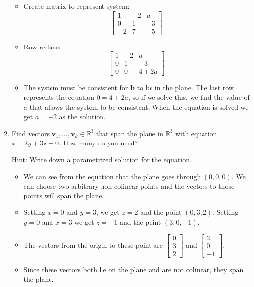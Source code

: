 \documentclass[12pt,a4paper]{exam}
\newcommand{\bb}{\mathbf{b}}
\newcommand{\bv}{\mathbf{v}}
\newcommand{\R}{\mathbb{R}}
\begin{document}
\begin{enumerate}
\begin{solution}
  \begin{itemize}
    \item Create matrix to represent system:\\
      \[
      \left[ \begin{array}{ccc}
          1 & -2 & a \\ 0 & 1 & -3 \\ -2 & 7 & -5
      \end{array} \right]
      \]
    \item Row reduce:\\
      \[
      \left[ \begin{array}{ccc}
        1 & -2 & a \\ 0 & 1 & -3 \\ 0 & 0 & 4+2a
      \end{array} \right]
      \]
    \item The system must be consistent for $\bb$ to be in the plane.
          The last row represents the equation $0=4+2a$, so if we solve this, we find the value of $a$ that allows the system to be consistent.
          When the equation is solved we get $a=-2$ as the solution.
  \end{itemize}
\end{solution}




\item
 Find vectors $\bv_1,\dots,\bv_k\in\R^3$ that span the plane in $\R^3$ with equation $x-2y+3z = 0$.
 How many do you need?

 Hint: Write down a parametrized solution for the equation. 

\begin{solution}
  \begin{itemize}
    \item We can see from the equation that the plane goes through $(0,0,0)$. We can choose two arbitrary non-colinear points and the vectors to those points will span the plane.
    \item Setting $x=0$ and $y=3$, we get $z=2$ and the point $(0,3,2)$. Setting $y=0$ and $x=3$ we get $z=-1$ and the point $(3,0,-1)$.
    \item The vectors from the origin to these point are $ \left[ \begin{array}{c} 0 \\ 3 \\ 2 \end{array} \right]$ and $\left[ \begin{array}{c} 3 \\ 0 \\ -1 \end{array} \right]$.
    \item Since these vectors both lie on the plane and are not colinear, they span the plane.
  \end{itemize}
\end{solution}



\end{enumerate}
\end{document}
